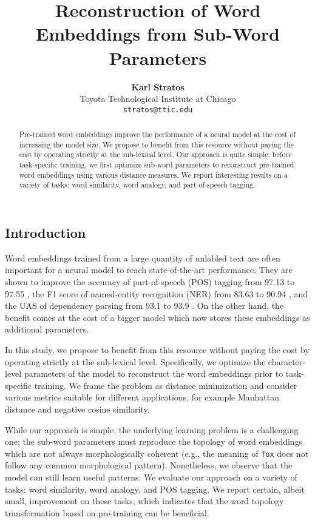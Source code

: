 \documentclass[11pt,letterpaper,UTF8]{article}
\title{Reconstruction of Word Embeddings from Sub-Word Parameters}
\author{
  {\bf Karl Stratos} \\
  Toyota Technological Institute at Chicago \\
  {\tt stratos@ttic.edu}
  }
\date{}
\begin{document}
\maketitle
\begin{CJK}{UTF8}{gbsn}


\begin{abstract}

Pre-trained word embeddings improve the performance of a neural model at the cost of increasing the model size.
We propose to benefit from this resource without paying the cost by operating strictly at the sub-lexical level.
Our approach is quite simple: before task-specific training, we first optimize sub-word parameters to reconstruct
pre-trained word embeddings using various distance measures.
We report interesting results on a variety of tasks: word similarity, word analogy, and part-of-speech tagging.

\end{abstract}

\section{Introduction}
\label{sec:intro}

Word embeddings trained from a large quantity of unlabled text
are often important for a neural model to reach state-of-the-art performance.
They are shown to improve the accuracy of part-of-speech (POS) tagging from 97.13 to 97.55 \cite{ma2016end},
the F1 score of named-entity recognition (NER) from 83.63 to 90.94 \cite{lample2016neural},
and the UAS of dependency parsing from 93.1 to 93.9 \cite{TACL885}.
On the other hand, the benefit comes at the cost of a bigger model which now stores these embeddings as additional parameters.

In this study, we propose to benefit from this resource without paying the cost by operating strictly at the sub-lexical level.
Specifically, we optimize the character-level parameters of the model to reconstruct the word embeddings prior to task-specific training.
We frame the problem as distance minimization and consider various metrics suitable for different applications,
for example Manhattan distance and negative cosine similarity.

While our approach is simple, the underlying learning problem is a challenging one; the sub-word parameters must reproduce the topology of word embeddings
which are not always morphologically coherent (e.g., the meaning of \texttt{fox} does not follow any common morphological pattern).
Nonetheless, we observe that the model can still learn useful patterns.
We evaluate our approach on a variety of tasks: word similarity, word analogy, and POS tagging.
We report certain, albeit small, improvement on these tasks,
which indicates that the word topology transformation based on pre-training can be beneficial.


\end{CJK}
\end{document}
